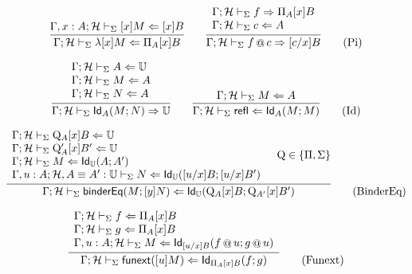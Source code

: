 \documentclass{amsart}
\begin{document}
\begin{equation}
  \infer{
    \Gamma;\mathcal{H}\vdash_\Sigma\lambda [x]M\checks\Pi_A[x]B
  }{
    \Gamma,x:A;\mathcal{H}\vdash_\Sigma [x]M\checks[x]B
  }
  \qquad
  \infer{
    \Gamma;\mathcal{H}\vdash_\Sigma f\mathop{@}c \infers [c/x]B
  }{
    \begin{array}{l}
      \Gamma;\mathcal{H}\vdash_\Sigma f\infers\Pi_A[x]B\\
      \Gamma;\mathcal{H}\vdash_\Sigma c\checks A
    \end{array}
  }
  \tag{Pi}
\end{equation}

\begin{equation}
  \infer{
    \Gamma;\mathcal{H}\vdash_\Sigma \mathsf{Id}_A(M;N)\infers\uni
  }{
    \begin{array}{l}
      \Gamma;\mathcal{H}\vdash_\Sigma A\checks\uni\\
      \Gamma;\mathcal{H}\vdash_\Sigma M\checks A\\
      \Gamma;\mathcal{H}\vdash_\Sigma N\checks A
    \end{array}
  }
  \qquad
  \infer{
    \Gamma;\mathcal{H}\vdash_\Sigma \mathsf{refl}\checks \mathsf{Id}_A(M;M)
  }{
    \Gamma;\mathcal{H}\vdash_\Sigma M\checks A
  }
  \tag{Id}
\end{equation}

\begin{equation}
  \infer{
    \Gamma;\mathcal{H}\vdash_\Sigma \mathsf{binderEq}(M; [y]N) \checks \mathsf{Id}_\uni(\mathrm{Q}_A[x]B;\mathrm{Q}_{A'}[x]B')
  }{
    \begin{array}{l}
      \Gamma;\mathcal{H}\vdash_\Sigma \mathrm{Q}_A[x]B \checks\uni\\
      \Gamma;\mathcal{H}\vdash_\Sigma \mathrm{Q}_A'[x]B' \checks\uni\\
      \Gamma;\mathcal{H}\vdash_\Sigma M \checks \mathsf{Id}_\uni(A; A')\\
      \Gamma,u:A;\mathcal{H},A\equiv A':\uni \vdash_\Sigma N\checks \mathsf{Id}_\uni([u/x]B; [u/x]B')
    \end{array}&
    \mathrm{Q}\in\{\Pi,\Sigma\}
  }
  \tag{BinderEq}
\end{equation}

\begin{equation}
  \infer{
    \Gamma;\mathcal{H}\vdash_\Sigma \mathsf{funext}([u]M)\checks \mathsf{Id}_{\Pi_A[x]B}(f; g)
  }{
    \begin{array}{l}
      \Gamma;\mathcal{H}\vdash_\Sigma f\checks \Pi_A[x]B\\
      \Gamma;\mathcal{H}\vdash_\Sigma g\checks \Pi_A[x]B\\
      \Gamma,u:A;\mathcal{H}\vdash_\Sigma M\checks \mathsf{Id}_{[u/x]B}(f\mathop{@}u;g\mathop{@}u)
    \end{array}
  }
  \tag{Funext}
\end{equation}
\end{document}
